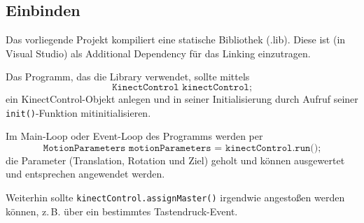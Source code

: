 \subsection{Einbinden}\label{sec:einbinden}
Das vorliegende Projekt kompiliert eine statische Bibliothek (.lib). Diese ist (in Visual Studio) als \glqq{}Additional Dependency\grqq{} für das Linking einzutragen.\par\medskip
Das Programm, das die Library verwendet, sollte mittels \[\texttt{KinectControl kinectControl;}\]ein KinectControl-Objekt anlegen und in seiner Initialisierung durch Aufruf seiner \texttt{init()}-Funktion mitinitialisieren.\par 
Im Main-Loop oder Event-Loop des Programms werden per \[\texttt{MotionParameters motionParameters = kinectControl.run();}\] die Parameter (Translation, Rotation und Ziel) geholt und können ausgewertet und entsprechen angewendet werden.\par 
Weiterhin sollte \texttt{kinectControl.assignMaster()} irgendwie angestoßen werden können, z.\,B. über ein bestimmtes Tastendruck-Event.